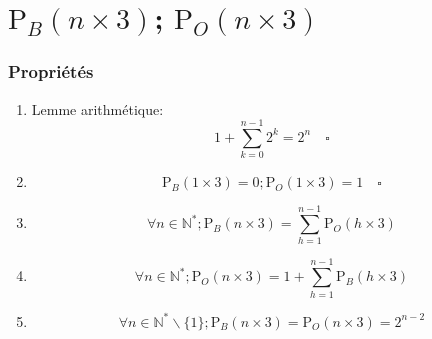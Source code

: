 \documentclass[twoside, a4paper, 12pt]{report}
\newcommand{\subcqfd}[1][\quad]{\ensuremath{#1\square}}
\newcommand{\pb}[2]{\ensuremath{\text{P}_B\left(#1 \times #2\right)}}
\newcommand{\po}[2]{\ensuremath{\text{P}_O\left(#1 \times #2\right)}}
\begin{document}
\section{\pb{n}{3}; \po{n}{3}}
\subsubsection{Propriétés}
\begin{enumerate}
\item Lemme arithmétique:
\[1 + \sum_{k=0}^{n-1} 2^k = 2^n  \subcqfd\]
\item \[\pb{1}{3} = 0; \po{1}{3} = 1 \subcqfd\]
\item \[\forall n \in \mathbb{N^*}; \pb{n}{3} = \sum_{h=1}^{n-1} \po{h}{3}\]
\item \[\forall n \in \mathbb{N^*}; \po{n}{3} = 1 + \sum_{h=1}^{n-1} \pb{h}{3}\]
\item \[\forall n \in \mathbb{N^*} \backslash \{1\}; \pb{n}{3} = \po{n}{3} = 2^{n-2}\]
\end{enumerate}
\end{document}
